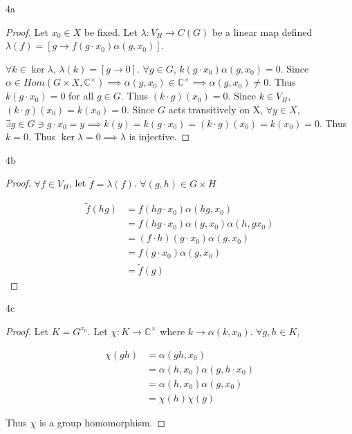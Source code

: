 \documentclass{article}
\newcommand{\C}{\mathbb{C}}
\begin{document}
\bigskip


\begin{PROB}{4a}\label{Problem 4a.}
\end{PROB}
\begin{proof}
    Let $x_0 \in X$ be fixed. Let $\lambda: V_H \to C(G)$ be a linear map defined $\lambda(f) = [g \to f(g \cdot x_0)\alpha(g,x_0)]$. 
    
    $\forall k \in \ker \lambda$, $\lambda(k) = \left[g \to 0\right]$. $\forall g \in G$, $k(g \cdot x_0)\alpha(g, x_0) = 0$. Since $\alpha \in Hom(G \times X, \C^\times) \implies \alpha(g, x_0) \in \C^\times \implies \alpha(g,x_0) \neq 0$. Thus $k(g \cdot x_0)= 0$ for all $g \in G$. Thus $(k \cdot g)(x_0) = 0$. Since $k \in V_H$, $(k \cdot g)(x_0) = k(x_0) = 0$. Since $G$ acts transitively on X, $\forall y \in X$, $\exists g \in G \ni g\cdot x_0 = y \implies k(y)= k(g \cdot x_0) = (k \cdot g)(x_0) = k(x_0) = 0$. Thus $k = 0$. Thus $\ker \lambda = 0 \implies \lambda$ is injective.                      
\end{proof}

\begin{PROB}{4b}\label{Problem 4b.}
\end{PROB}
\begin{proof}
    $\forall f \in V_H$, let $\tilde{f} = \lambda(f)$. $\forall (g, h) \in G \times H$
    
    \begin{align*}
        \tilde{f}(hg) &= f(hg \cdot x_0)\alpha(hg, x_0) \\
        &= f(hg \cdot x_0) \alpha(g, x_0) \alpha(h, gx_0)\\
        &= (f \cdot h)(g \cdot x_0) \alpha(g, x_0) \\
        &= f(g \cdot x_0)\alpha(g, x_0) \\
        &= \tilde{f}(g)
    \end{align*}
\end{proof}

\begin{PROB}{4c}\label{Problem 4c.}
\end{PROB}
\begin{proof}
    Let $K = G^{x_0}$. Let $\chi: K \to \C^{\times}$ where $k \to \alpha(k, x_0)$. $\forall g, h \in K $, 
    
    \begin{align*}
        \chi(gh) &= \alpha(gh, x_0) \\
        &= \alpha(h, x_0)\alpha(g, h \cdot x_0) \\
        &= \alpha(h, x_0) \alpha(g, x_0) \\
        &= \chi(h) \chi(g)
    \end{align*}

    Thus $\chi$ is a group homomorphism. 
\end{proof}
\end{document}
